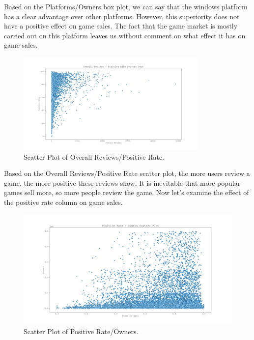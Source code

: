 \documentclass[conference]{IEEEtran}
\begin{document}
Based on the Platforms/Owners box plot, we can say that the windows platform has a clear advantage over other platforms. However, this superiority does not have a positive effect on game sales. The fact that the game market is mostly carried out on this platform leaves us without comment on what effect it has on game sales.

\begin{figure}[h]
  \includegraphics[width=\linewidth, height=5cm]{assets-2/overall_reviews_and_positive_rate.png}
  \caption{Scatter Plot of Overall Reviews/Positive Rate.}
  \label{fig:overall_reviews_positive_rate1}
\end{figure}
\FloatBarrier

Based on the Overall Reviews/Positive Rate scatter plot, the more users review a game, the more positive these reviews show. It is inevitable that more popular games sell more, so more people review the game. Now let's examine the effect of the positive rate column on game sales.

\begin{figure}[h]
  \includegraphics[width=\linewidth]{assets-2/positive_rate_owners_scatter.png}
  \caption{Scatter Plot of Positive Rate/Owners.}
  \label{fig:positive_rate_owners1}
\end{figure}
\FloatBarrier
\end{document}
